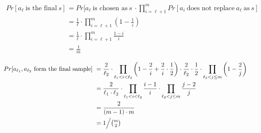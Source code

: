 \begin{equation}
	\begin{split}
	Pr[a_\ell\ \textrm{is the final}\ s]\ 
	& = Pr[a_\ell\ \textrm{is chosen as}\ s\ \cdot \prod_{i=\ell+1}^{m} Pr[a_i\ \textrm{does not replace}\ a_\ell\ \textrm{as}\ s] \\
	& = \frac{1}{\ell} \cdot \prod_{i=\ell+1}^{m}\left(1-\frac{1}{i}\right) \\
	& = \frac{1}{\ell} \cdot \prod_{i=\ell+1}^{m}\frac{1-i}{i} \\
	& = \frac{1}{m}
	\end{split}
\end{equation}

\begin{equation}
	\begin{split}
	Pr[a_{\ell_1}, a_{\ell_2}\ \textrm{form the final sample}]\ 
	& = \frac{2}{\ell_2} \cdot \prod_{\ell_1<i<\ell_2} \left(1- \frac{2}{i} + \frac{2}{i} \cdot \frac{1}{2}\right) \cdot \frac{2}{\ell_2} \cdot \frac{1}{2} \cdot \prod_{\ell_2 < j \le m} \left( 1 - \frac{2}{j} \right)  \\
	& = \frac{2}{\ell_1 \cdot \ell_2} \cdot \prod_{\ell_1 < i < \ell_2} \frac{i-1}{i} \cdot \prod_{\ell_2 < j \le m} \frac{j-2}{j} \\
	& = \frac{2}{\left( m - 1 \right) \cdot m} \\
	& = 1\Big/\tbinom{m}{2}
	\end{split}
\end{equation}

